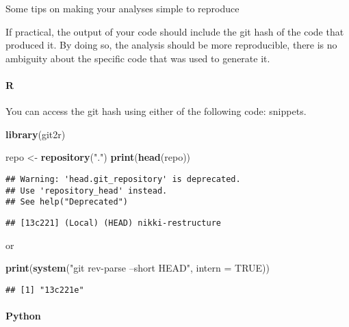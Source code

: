 \documentclass[]{book}
\newenvironment{Shaded}{\begin{snugshade}}{\end{snugshade}}
\newcommand{\DataTypeTok}[1]{\textcolor[rgb]{0.13,0.29,0.53}{#1}}
\newcommand{\KeywordTok}[1]{\textcolor[rgb]{0.13,0.29,0.53}{\textbf{#1}}}
\newcommand{\NormalTok}[1]{#1}
\newcommand{\OtherTok}[1]{\textcolor[rgb]{0.56,0.35,0.01}{#1}}
\newcommand{\StringTok}[1]{\textcolor[rgb]{0.31,0.60,0.02}{#1}}
\let\oldparagraph\paragraph
\renewcommand{\paragraph}[1]{\oldparagraph{#1}\mbox{}}
\begin{document}
Some tips on making your analyses simple to reproduce

If practical, the output of your code should include the git hash
of the code that produced it. By doing so, the analysis should be
more reproducible, there is no ambiguity about the specific code
that was used to generate it.

\hypertarget{r}{%
\paragraph{R}\label{r}}

You can access the git hash using either of the following code:
snippets.

\begin{Shaded}
\begin{Highlighting}[]
\KeywordTok{library}\NormalTok{(git2r)}

\NormalTok{repo <-}\StringTok{ }\KeywordTok{repository}\NormalTok{(}\StringTok{"."}\NormalTok{)}
\KeywordTok{print}\NormalTok{(}\KeywordTok{head}\NormalTok{(repo))}
\end{Highlighting}
\end{Shaded}

\begin{verbatim}
## Warning: 'head.git_repository' is deprecated.
## Use 'repository_head' instead.
## See help("Deprecated")
\end{verbatim}

\begin{verbatim}
## [13c221] (Local) (HEAD) nikki-restructure
\end{verbatim}

or

\begin{Shaded}
\begin{Highlighting}[]
\KeywordTok{print}\NormalTok{(}\KeywordTok{system}\NormalTok{(}\StringTok{"git rev-parse --short HEAD"}\NormalTok{, }\DataTypeTok{intern =} \OtherTok{TRUE}\NormalTok{))}
\end{Highlighting}
\end{Shaded}

\begin{verbatim}
## [1] "13c221e"
\end{verbatim}

\hypertarget{python}{%
\paragraph{Python}\label{python}}
\end{document}
